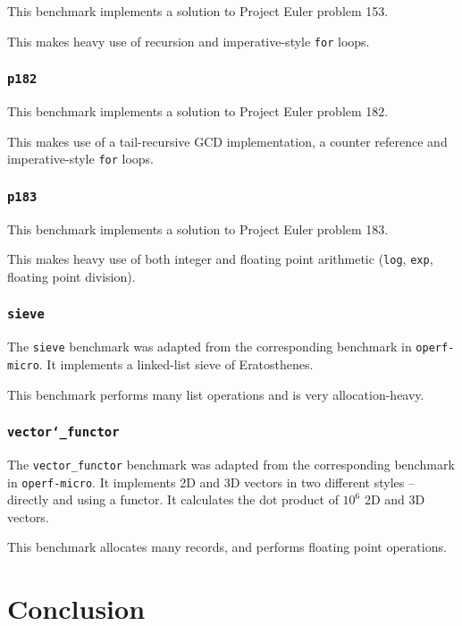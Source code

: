 \documentclass[12pt,a4paper,twoside,openright]{report}
\begin{document}
This benchmark implements a solution to Project Euler problem 153.

This makes heavy use of recursion and imperative-style \lstinline!for! loops.

\subsection{\texttt{p182}}

This benchmark implements a solution to Project Euler problem 182.

This makes use of a tail-recursive GCD implementation, a counter reference and imperative-style \lstinline!for! loops.

\subsection{\texttt{p183}}

This benchmark implements a solution to Project Euler problem 183.

This makes heavy use of both integer and floating point arithmetic (\lstinline!log!, \lstinline!exp!, floating point division).

\subsection{\texttt{sieve}}

The \lstinline!sieve! benchmark was adapted from the corresponding benchmark in
\lstinline!operf-micro!. It implements a linked-list sieve of Eratosthenes.

This benchmark performs many list operations and is very allocation-heavy.

\subsection{\texttt{vector\char`_functor}}

The \lstinline!vector_functor! benchmark was adapted from the corresponding
benchmark in \lstinline!operf-micro!. It implements 2D and 3D vectors in two
different styles -- directly and using a functor. It calculates the dot product
of $10^6$ 2D and 3D vectors.

This benchmark allocates many records, and performs floating point operations.

\chapter{Conclusion}
\end{document}
